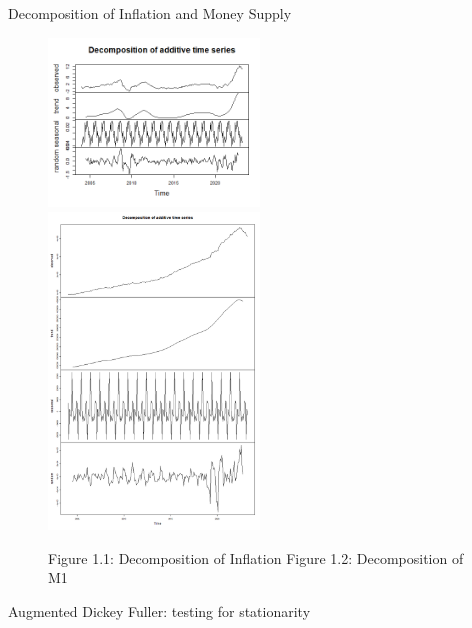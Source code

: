 \documentclass{article}
\newenvironment{myenv}
{
    \color{mydarkblue} %
    \fontsize{9pt}{9pt}\selectfont %

}
{
}
\begin{document}
    \begin{mdframed}[style=sectionstyle]
        Decomposition of Inflation and Money Supply
    \end{mdframed}
    \begin{figure}[htbp]
        \includegraphics*[width=0.5\textwidth]{../graphs/Decomposition of Inflation.png}%
        \includegraphics*[width=0.5\textwidth]{../graphs/Decomposition of M1.png}
        \vspace{-\baselineskip}
        \begin{myenv}
            \hspace*{0.1\textwidth}
            Figure 1.1: Decomposition of Inflation \hspace*{0.15\textwidth} 
            Figure 1.2: Decomposition of M1
        \end{myenv}
    \end{figure}
    \vspace*{0.1cm}
    \begin{mdframed}[style=sectionstyle]
        Augmented Dickey Fuller: testing for stationarity
    \end{mdframed}
        
\end{document}
